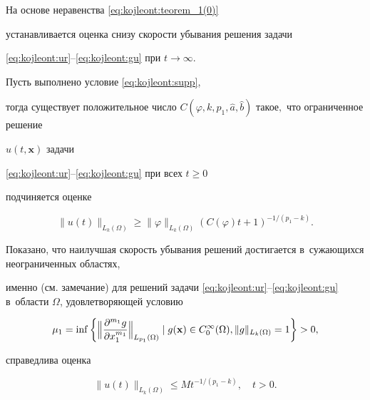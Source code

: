 \smallskip



На основе неравенства \eqref{eq:kojleont:teorem_1(0)}

устанавливается оценка снизу скорости убывания решения задачи

\eqref{eq:kojleont:ur}--\eqref{eq:kojleont:gu} при $t\to \infty$.





\smallskip



\begin{theorem}[2]\label{eq:kojleont:the_0} Пусть выполнено условие  \eqref{eq:kojleont:supp},

тогда существует положительное число $C(\varphi, k, p_1, \widehat{a}, \widehat{b})$ такое$,$ что ограниченное решение

$u(t,\mathbf{x})$ задачи

\eqref{eq:kojleont:ur}--\eqref{eq:kojleont:gu} при всех $t\geq 0$

подчиняется оценке

\begin{equation}\label{eq:kojleont:teorem_0}

\|u(t)\|_{L_k(\Omega)}\geq

\|\varphi\|_{L_k(\Omega)}\left(C(\varphi)t+1\right)^{-1/(p_1-k)}.

\end{equation}

\end{theorem}



\smallskip



Показано, что наилучшая скорость убывания решений достигается в~сужающихся неограниченных областях,

именно (см. замечание) для решений задачи \eqref{eq:kojleont:ur}--\eqref{eq:kojleont:gu} в~области $\Omega$, удовлетворяющей условию

\begin{equation}

\label{eq:kojleont:mu}

\mu_1=\inf\left\{  \Bigl\|\frac{\partial^{m_1} g}{\partial x_1^{m_1}} \Bigr\|_{L_{p_1}(\Omega)} \mid g({\bf x})\in C_0^{\infty}(\Omega), \|g\|_{L_{k}(\Omega)}=1\right\}>0,\end{equation}

справедлива оценка

\begin{equation}

\label{eq:kojleont:sle_1}

\|u(t)\|_{L_k(\Omega)}\leq{M}t^{-1/(p_{1}-k)},\quad t>0.

\end{equation}



